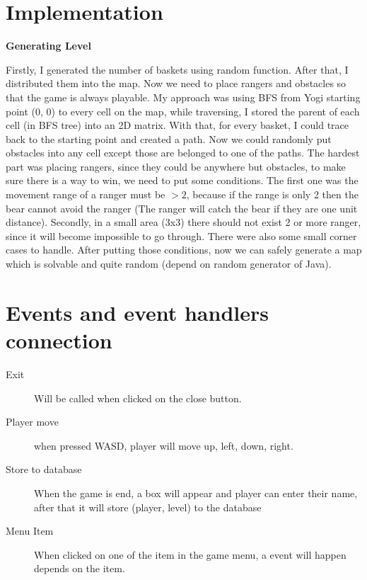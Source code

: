 \documentclass[a4paper, 12pt]{report}
\begin{document}
\chapter{Implementation}

\textbf{Generating Level}

Firstly, I generated the number of baskets using random function. After that, I distributed them into the map. Now we need to place rangers and obstacles so that the game is always playable. My approach was using BFS from Yogi starting point (0, 0) to every cell on the map, while traversing, I stored the parent of each cell (in BFS tree) into an 2D matrix. With that, for every basket, I could trace back to the starting point and created a path. Now we could randomly put obstacles into any cell except those are belonged to one of the paths. The hardest part was placing rangers, since they could be anywhere but obstacles, to make sure there is a way to win, we need to put some conditions. The first one was the movement range of a ranger must be $> 2$, because if the range is only 2 then the bear cannot avoid the ranger (The ranger will catch the bear if they are one unit distance). Secondly, in a small area (3x3) there should not exist 2 or more ranger, since it will become impossible to go through. There were also some small corner cases to handle. After putting those conditions, now we can safely generate a map which is solvable and quite random (depend on random generator of Java).

\chapter{Events and event handlers connection}
\begin{description}
	\item[Exit] Will be called when clicked on the close button.
	\item[Player move] when pressed WASD, player will move up, left, down, right.
	\item[Store to database] When the game is end, a box will appear and player can enter their name, after that it will store (player, level) to the database
	\item[Menu Item] When clicked on one of the item in the game menu, a event will happen depends on the item.
\end{description}
\end{document}
